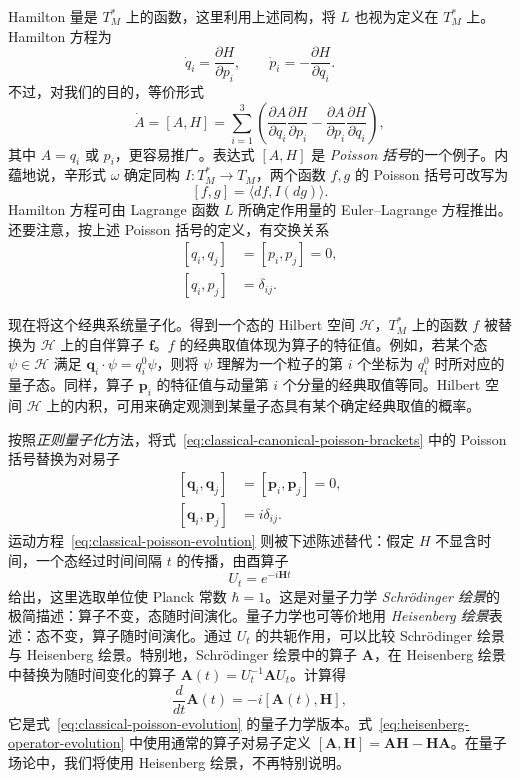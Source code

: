 Hamilton 量是 $T_M^*$ 上的函数，这里利用上述同构，将 $L$ 也视为定义在 $T_M^*$ 上。Hamilton 方程为
\[
\dot q_i=\frac{\partial H}{\partial p_i},\qquad
\dot p_i=-\frac{\partial H}{\partial q_i}.
\]
不过，对我们的目的，等价形式
\begin{equation}\label{eq:classical-poisson-evolution}
\dot A=[A,H]=\sum_{i=1}^3
\left(\frac{\partial A}{\partial q_i}\frac{\partial H}{\partial p_i}
-\frac{\partial A}{\partial p_i}\frac{\partial H}{\partial q_i}\right),
\end{equation}
其中 $A=q_i$ 或 $p_i$，更容易推广。表达式 $[A,H]$ 是 \emph{Poisson 括号}的一个例子。内蕴地说，辛形式 $\omega$ 确定同构 $I:T_M^*\to T_M$，两个函数 $f,g$ 的 Poisson 括号可改写为
\[
[f,g]=\langle df,I(dg)\rangle.
\]
Hamilton 方程可由 Lagrange 函数 $L$ 所确定作用量的 Euler--Lagrange 方程推出。还要注意，按上述 Poisson 括号的定义，有交换关系
\begin{equation}\label{eq:classical-canonical-poisson-brackets}
\begin{aligned}
[q_i,q_j]&=[p_i,p_j]=0,\\
[q_i,p_j]&=\delta_{ij}.
\end{aligned}
\end{equation}

现在将这个经典系统量子化。得到一个态的 Hilbert 空间 $\mathcal H$，$T_M^*$ 上的函数 $f$ 被替换为 $\mathcal H$ 上的自伴算子 $\mathbf f$。$f$ 的经典取值体现为算子的特征值。例如，若某个态 $\psi\in\mathcal H$ 满足 $\mathbf q_i\cdot\psi=q_i^0\psi$，则将 $\psi$ 理解为一个粒子的第 $i$ 个坐标为 $q_i^0$ 时所对应的量子态。同样，算子 $\mathbf p_i$ 的特征值与动量第 $i$ 个分量的经典取值等同。Hilbert 空间 $\mathcal H$ 上的内积，可用来确定观测到某量子态具有某个确定经典取值的概率。

按照\emph{正则量子化}方法，将式~\eqref{eq:classical-canonical-poisson-brackets} 中的 Poisson 括号替换为对易子
\[
\begin{aligned}
[\mathbf q_i,\mathbf q_j]&=[\mathbf p_i,\mathbf p_j]=0,\\
[\mathbf q_i,\mathbf p_j]&=i\delta_{ij}.
\end{aligned}
\]
运动方程~\eqref{eq:classical-poisson-evolution} 则被下述陈述替代：假定 $H$ 不显含时间，一个态经过时间间隔 $t$ 的传播，由酉算子
\begin{equation}\label{eq:quantum-unitary-time-evolution}
U_t=e^{-i\mathbf Ht}
\end{equation}
给出，这里选取单位使 Planck 常数 $\hbar=1$。这是对量子力学 \emph{Schrödinger 绘景}的极简描述：算子不变，态随时间演化。量子力学也可等价地用 \emph{Heisenberg 绘景}表述：态不变，算子随时间演化。通过 $U_t$ 的共轭作用，可以比较 Schrödinger 绘景与 Heisenberg 绘景。特别地，Schrödinger 绘景中的算子 $\mathbf A$，在 Heisenberg 绘景中替换为随时间变化的算子 $\mathbf A(t)=U_t^{-1}\mathbf A U_t$。计算得
\begin{equation}\label{eq:heisenberg-operator-evolution}
\frac{d}{dt}\mathbf A(t)=-i[\mathbf A(t),\mathbf H],
\end{equation}
它是式~\eqref{eq:classical-poisson-evolution} 的量子力学版本。式~\eqref{eq:heisenberg-operator-evolution} 中使用通常的算子对易子定义 $[\mathbf A,\mathbf H]=\mathbf A\mathbf H-\mathbf H\mathbf A$。在量子场论中，我们将使用 Heisenberg 绘景，不再特别说明。

